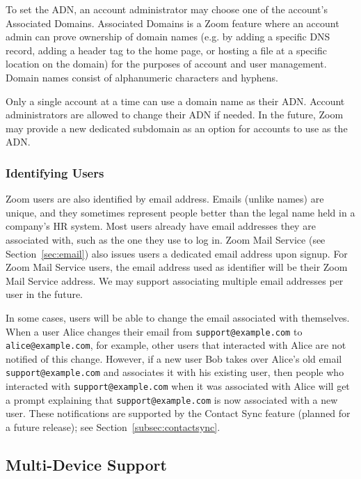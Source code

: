 To set the ADN, an account administrator may choose one of the account's Associated Domains. 
Associated Domains is a Zoom feature where an account admin can prove ownership 
of domain names (e.g. by adding a specific DNS record, adding a header tag 
to the home page, or hosting a file at a specific location on the domain) for the 
purposes of account and user management. Domain names consist of
alphanumeric characters and hyphens. 

Only a single account at a time can use a domain name as their ADN. Account
administrators are allowed to change their ADN if needed. In the future, Zoom
may provide a new dedicated subdomain as an option for accounts to use as the
ADN.

\subsubsection{Identifying Users}

Zoom users are also identified by email address. Emails (unlike names) are unique, and they
sometimes represent people better than the legal name held in a company's HR system. Most users
already have email addresses they are associated with, such as the one they use to log in. Zoom Mail
Service (see Section~\ref{sec:email}) also issues users a dedicated email address upon signup. For
Zoom Mail Service users, the email address used as identifier will be their Zoom Mail Service
address. We may support associating multiple email addresses per user in the future.

In some cases, users will be able to change the email associated with themselves. When a user Alice
changes their email from \texttt{support@example.com} to \texttt{alice@example.com}, for example,
other users that interacted with Alice are not notified of this change. However, if a new user Bob
takes over Alice's old email \texttt{support@example.com} and associates it with his existing user,
then people who interacted with \texttt{support@example.com} when it was associated with Alice will
get a prompt explaining that \texttt{support@example.com} is now associated with a new user. These
notifications are supported by the Contact Sync feature (planned for a future release); see
Section~\ref{subsec:contactsync}.

\subsection{Multi-Device Support}
\label{subsec:multidev}

